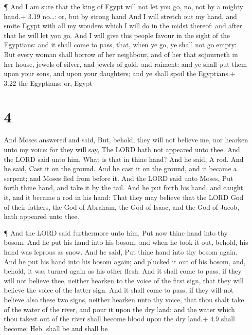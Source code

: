  ¶ And I am sure that the king of Egypt will not let you
go, no, not by a mighty hand.+ 3.19 no\ldots: or, but by strong hand
 And I will stretch out my hand, and smite Egypt with all
my wonders which I will do in the midst thereof: and after that he will
let you go.  And I will give this people favour in the
sight of the Egyptians: and it shall come to pass, that, when ye go, ye
shall not go empty:  But every woman shall borrow of her
neighbour, and of her that sojourneth in her house, jewels of silver,
and jewels of gold, and raiment: and ye shall put them upon your sons,
and upon your daughters; and ye shall spoil the Egyptians.+ 3.22 the
Egyptians: or, Egypt

\hypertarget{section-3}{%
\section{4}\label{section-3}}

 And Moses answered and said, But, behold, they will not
believe me, nor hearken unto my voice: for they will say, The LORD hath
not appeared unto thee.  And the LORD said unto him, What is
that in thine hand? And he said, A rod.  And he said, Cast
it on the ground. And he cast it on the ground, and it became a serpent;
and Moses fled from before it.  And the LORD said unto
Moses, Put forth thine hand, and take it by the tail. And he put forth
his hand, and caught it, and it became a rod in his hand: 
That they may believe that the LORD God of their fathers, the God of
Abraham, the God of Isaac, and the God of Jacob, hath appeared unto
thee.

 ¶ And the LORD said furthermore unto him, Put now thine
hand into thy bosom. And he put his hand into his bosom: and when he
took it out, behold, his hand was leprous as snow.  And he
said, Put thine hand into thy bosom again. And he put his hand into his
bosom again; and plucked it out of his bosom, and, behold, it was turned
again as his other flesh.  And it shall come to pass, if
they will not believe thee, neither hearken to the voice of the first
sign, that they will believe the voice of the latter sign. 
And it shall come to pass, if they will not believe also these two
signs, neither hearken unto thy voice, that thou shalt take of the water
of the river, and pour it upon the dry land: and the water which thou
takest out of the river shall become blood upon the dry land.+ 4.9 shall
become: Heb. shall be and shall be


